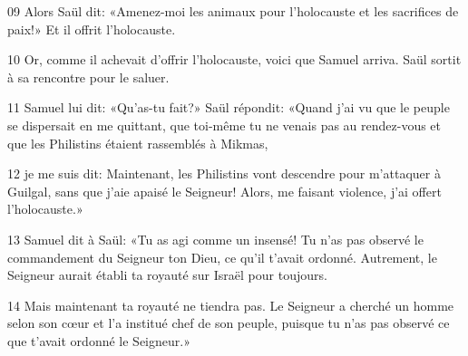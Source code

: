 
09 Alors Saül dit: «Amenez-moi les animaux pour l’holocauste et les sacrifices de paix!» Et il offrit l’holocauste.

10 Or, comme il achevait d’offrir l’holocauste, voici que Samuel arriva. Saül sortit à sa rencontre pour le saluer.

11 Samuel lui dit: «Qu’as-tu fait?» Saül répondit: «Quand j’ai vu que le peuple se dispersait en me quittant, que toi-même tu ne venais pas au rendez-vous et que les Philistins étaient rassemblés à Mikmas,

12 je me suis dit: Maintenant, les Philistins vont descendre pour m’attaquer à Guilgal, sans que j’aie apaisé le Seigneur! Alors, me faisant violence, j’ai offert l’holocauste.»

13 Samuel dit à Saül: «Tu as agi comme un insensé! Tu n’as pas observé le commandement du Seigneur ton Dieu, ce qu’il t’avait ordonné. Autrement, le Seigneur aurait établi ta royauté sur Israël pour toujours.

14 Mais maintenant ta royauté ne tiendra pas. Le Seigneur a cherché un homme selon son cœur et l’a institué chef de son peuple, puisque tu n’as pas observé ce que t’avait ordonné le Seigneur.»
